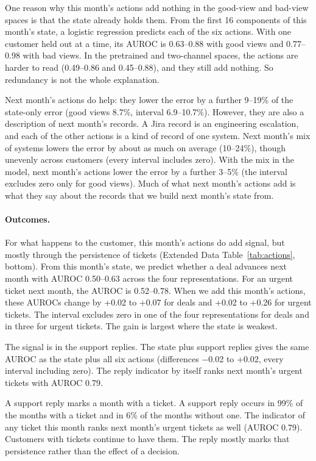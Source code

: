\documentclass[11pt]{article}
\begin{document}
One reason why this month's actions add nothing in the good-view and bad-view spaces is that the state already holds them. From the first 16 components of this month's state, a logistic regression predicts each of the six actions. With one customer held out at a time, its AUROC is 0.63--0.88 with good views and 0.77--0.98 with bad views. In the pretrained and two-channel spaces, the actions are harder to read (0.49--0.86 and 0.45--0.88), and they still add nothing. So redundancy is not the whole explanation.

Next month's actions do help: they lower the error by a further 9--19\% of the state-only error (good views 8.7\%, interval 6.9--10.7\%). However, they are also a description of next month's records. A Jira record is an engineering escalation, and each of the other actions is a kind of record of one system. Next month's mix of systems lowers the error by about as much on average (10--24\%), though unevenly across customers (every interval includes zero). With the mix in the model, next month's actions lower the error by a further 3--5\% (the interval excludes zero only for good views). Much of what next month's actions add is what they say about the records that we build next month's state from.

\paragraph{Outcomes.} For what happens to the customer, this month's actions do add signal, but mostly through the persistence of tickets (Extended Data Table~\ref{tab:actions}, bottom). From this month's state, we predict whether a deal advances next month with AUROC 0.50--0.63 across the four representations. For an urgent ticket next month, the AUROC is 0.52--0.78. When we add this month's actions, these AUROCs change by +0.02 to +0.07 for deals and +0.02 to +0.26 for urgent tickets. The interval excludes zero in one of the four representations for deals and in three for urgent tickets. The gain is largest where the state is weakest.

The signal is in the support replies. The state plus support replies gives the same AUROC as the state plus all six actions (differences $-$0.02 to +0.02, every interval including zero). The reply indicator by itself ranks next month's urgent tickets with AUROC 0.79.

A support reply marks a month with a ticket. A support reply occurs in 99\% of the months with a ticket and in 6\% of the months without one. The indicator of any ticket this month ranks next month's urgent tickets as well (AUROC 0.79). Customers with tickets continue to have them. The reply mostly marks that persistence rather than the effect of a decision.
\end{document}
